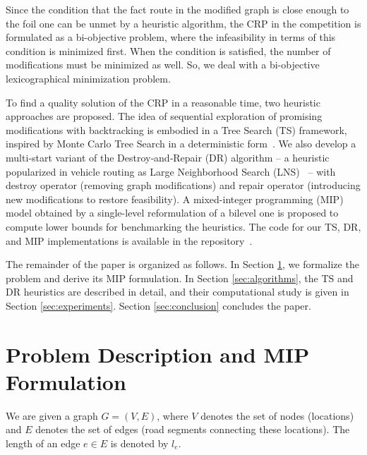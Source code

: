 \documentclass{article}
\begin{document}
Since the condition that the fact route in the modified graph is close enough to the foil one can be unmet by a heuristic algorithm, the CRP in the competition is formulated as a bi-objective problem, where the infeasibility in terms of this condition is minimized first.
When the condition is satisfied, the number of modifications must be minimized as well. 
So, we deal with a bi-objective lexicographical minimization problem. 

To find a quality solution of the CRP in a reasonable time, two heuristic approaches are proposed. 
The idea of sequential exploration of promising modifications with backtracking is embodied in a Tree Search (TS) framework, inspired by Monte Carlo Tree Search in a deterministic form~\cite{browne-et-al:survey-mcts}.
We also develop a multi‑start variant of the Destroy‑and‑Repair (DR) algorithm -- a heuristic popularized in vehicle routing as Large Neighborhood Search (LNS)~\cite{pisinger-ropke:lns} -- with destroy operator (removing graph modifications) and repair operator (introducing new modifications to restore feasibility).
A mixed-integer programming (MIP) model obtained by a single-level reformulation of a bilevel one is proposed to compute lower bounds for benchmarking the heuristics. The code for our TS, DR, and MIP implementations is available in the repository~\cite{codebase}.

The remainder of the paper is organized as follows.
In Section \ref{sec:problem}, we formalize the problem and derive its MIP formulation.
In Section \ref{sec:algorithms}, the TS and DR heuristics are described in detail, and their computational study is given in Section \ref{sec:experiments}.
Section \ref{sec:conclusion} concludes the paper.

\section{Problem Description and MIP Formulation}
\label{sec:problem}

We are given a graph $G = (V,E)$, where $V$ denotes the set of nodes (locations) and $E$ denotes the set of edges (road segments connecting these locations). 
The length of an edge $e\in E$ is denoted by $l_e$. 
\end{document}
